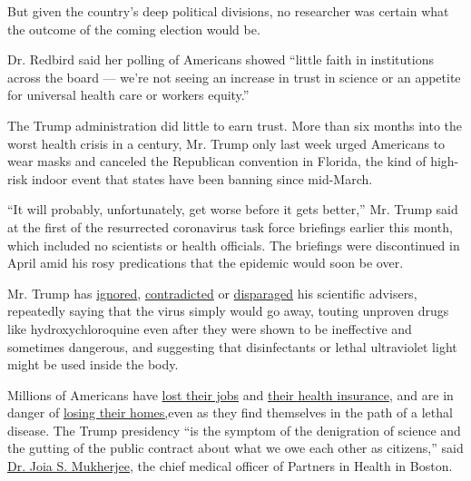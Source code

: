 But given the country's deep political divisions, no researcher was
certain what the outcome of the coming election would be.

Dr. Redbird said her polling of Americans showed ``little faith in
institutions across the board --- we're not seeing an increase in trust
in science or an appetite for universal health care or workers equity.''

The Trump administration did little to earn trust. More than six months
into the worst health crisis in a century, Mr. Trump only last week
urged Americans to wear masks and canceled the Republican convention in
Florida, the kind of high-risk indoor event that states have been
banning since mid-March.

``It will probably, unfortunately, get worse before it gets better,''
Mr. Trump said at the first of the resurrected coronavirus task force
briefings earlier this month, which included no scientists or health
officials. The briefings were discontinued in April amid his rosy
predications that the epidemic would soon be over.

Mr. Trump has
\href{https://www.nytimes3xbfgragh.onion/2020/03/23/us/politics/coronavirus-trump-fauci.html}{ignored},
\href{https://www.youtube.com/watch?v=yYhriqvJMSw}{contradicted} or
\href{https://www.cnn.com/2020/07/19/politics/trump-fauci-alarmist-coronavirus/index.html}{disparaged}
his scientific advisers, repeatedly saying that the virus simply would
go away, touting unproven drugs like hydroxychloroquine even after they
were shown to be ineffective and sometimes dangerous, and suggesting
that disinfectants or lethal ultraviolet light might be used inside the
body.

Millions of Americans have
\href{https://www.nytimes3xbfgragh.onion/live/2020/07/23/business/stock-market-today-coronavirus\#roughly-one-in-five-workers-are-collecting-unemployment-benefits}{lost
their jobs} and
\href{https://www.nytimes3xbfgragh.onion/2020/07/13/us/politics/coronavirus-health-insurance-trump.html}{their
health insurance}, and are in danger of
\href{https://www.nytimes3xbfgragh.onion/2020/07/23/opinion/coronavirus-evictions-rent.html}{losing
their homes,}even as they find themselves in the path of a lethal
disease. The Trump presidency ``is the symptom of the denigration of
science and the gutting of the public contract about what we owe each
other as citizens,'' said
\href{https://ghsm.hms.harvard.edu/faculty-staff/joia-stapleton-mukherjee}{Dr.
Joia S. Mukherjee}, the chief medical officer of Partners in Health in
Boston.

